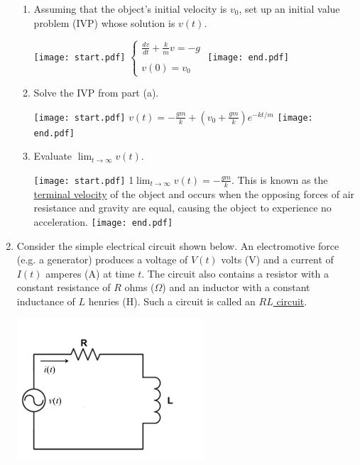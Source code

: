 \documentclass[12pt]{article}
\begin{document}
\begin{enumerate}
\begin{enumerate}

\item Assuming that the object's initial velocity is $v_0$, set up an initial value problem (IVP) whose solution is $v(t)$.

\texttt{[image: start.pdf]}
{{$\left\{\begin{array}{l}
\frac{dv}{dt}+\frac{k}{m}v=-g\\
\\
v(0)=v_0
\end{array}\right.$}}
\texttt{[image: end.pdf]}


\item Solve the IVP from part (a).  

\texttt{[image: start.pdf]}
{{$v(t)=-\frac{gm}{k}+\left(v_0+\frac{gm}{k}\right)e^{-kt/m}$}}
\texttt{[image: end.pdf]}


\item Evaluate $\lim_{t \rightarrow \infty}{v(t)}$.

\texttt{[image: start.pdf]}
{{{1\linewidth}{$\lim_{t \rightarrow \infty}{v(t)} = -\frac{gm}{k}$.  This is known as the \underline{terminal velocity} of the object and occurs when the opposing forces of air resistance 
and gravity are equal, causing the object to experience no acceleration.}}}
\texttt{[image: end.pdf]}


\end{enumerate}

\item Consider the simple electrical circuit shown below.  An electromotive force (e.g. a generator) produces a voltage of $V(t)$ volts (V) and a current of $I(t)$ amperes (A) at time $t$.  The circuit also contains a resistor 
with a constant resistance of $R$ ohms ($\Omega$) and an inductor with a constant inductance of $L$ henries (H).  Such a circuit is called an \underline{$RL$ circuit}. 

\includegraphics[width=7cm]{RL_circuit}


\end{enumerate}
\end{document}
